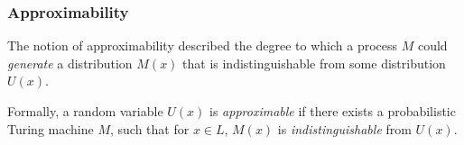 %
%
%
%
%
%
%
%


%
%
%
%
%

\subsubsection{Approximability}%

The notion of approximability described the degree to which a process $M$ could \textit{generate} a distribution $M(x)$ that is indistinguishable from some distribution $U(x)$.

Formally, a random variable $U(x)$ is \textit{approximable} if there exists a probabilistic Turing machine $M$, such that for $x \in L$, $M(x)$ is \textit{indistinguishable} from $U(x)$.

